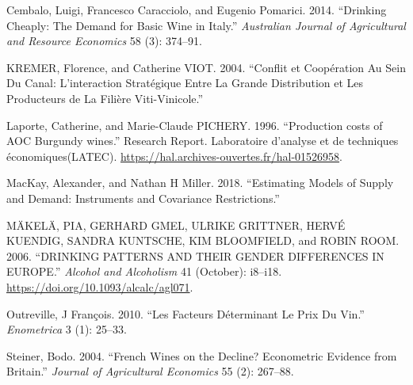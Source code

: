\documentclass[11pt,]{article}
\begin{document}
\leavevmode\hypertarget{ref-cembalo2014}{}%
Cembalo, Luigi, Francesco Caracciolo, and Eugenio Pomarici. 2014.
``Drinking Cheaply: The Demand for Basic Wine in Italy.''
\emph{Australian Journal of Agricultural and Resource Economics} 58 (3):
374--91.

\leavevmode\hypertarget{ref-kremer2004}{}%
KREMER, Florence, and Catherine VIOT. 2004. ``Conflit et Coopération Au
Sein Du Canal: L'interaction Stratégique Entre La Grande Distribution et
Les Producteurs de La Filière Viti-Vinicole.''

\leavevmode\hypertarget{ref-laporte1996}{}%
Laporte, Catherine, and Marie-Claude PICHERY. 1996. ``Production costs
of AOC Burgundy wines.'' Research Report. Laboratoire d'analyse et de
techniques économiques(LATEC).
\url{https://hal.archives-ouvertes.fr/hal-01526958}.

\leavevmode\hypertarget{ref-mackay2018}{}%
MacKay, Alexander, and Nathan H Miller. 2018. ``Estimating Models of
Supply and Demand: Instruments and Covariance Restrictions.''

\leavevmode\hypertarget{ref-makela2006}{}%
MÄKELÄ, PIA, GERHARD GMEL, ULRIKE GRITTNER, HERVÉ KUENDIG, SANDRA
KUNTSCHE, KIM BLOOMFIELD, and ROBIN ROOM. 2006. ``DRINKING PATTERNS AND
THEIR GENDER DIFFERENCES IN EUROPE.'' \emph{Alcohol and Alcoholism} 41
(October): i8--i18. \url{https://doi.org/10.1093/alcalc/agl071}.

\leavevmode\hypertarget{ref-outreville2010}{}%
Outreville, J François. 2010. ``Les Facteurs Déterminant Le Prix Du
Vin.'' \emph{Enometrica} 3 (1): 25--33.

\leavevmode\hypertarget{ref-steiner2004}{}%
Steiner, Bodo. 2004. ``French Wines on the Decline? Econometric Evidence
from Britain.'' \emph{Journal of Agricultural Economics} 55 (2):
267--88.
\end{document}
